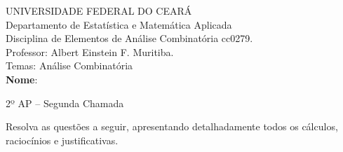 \documentclass[a4paper,12pt]{letter}  %
\begin{document}
\thispagestyle{empty}

UNIVERSIDADE FEDERAL DO CEARÁ\\
Departamento de Estatística e Matemática Aplicada\\
Disciplina de Elementos de Análise Combinatória cc0279.\\
Professor: Albert Einstein F. Muritiba.\\
Temas: Análise Combinatória\\[0.2cm]
\textbf{Nome}: \makebox[380pt]{\hrulefill} \vspace{2pt}
\begin{center}
	2º AP -- Segunda Chamada
\end{center}        
\begin{small}
Resolva as questões a seguir, apresentando detalhadamente todos os cálculos, raciocínios e justificativas.
\end{small}
\end{document}
